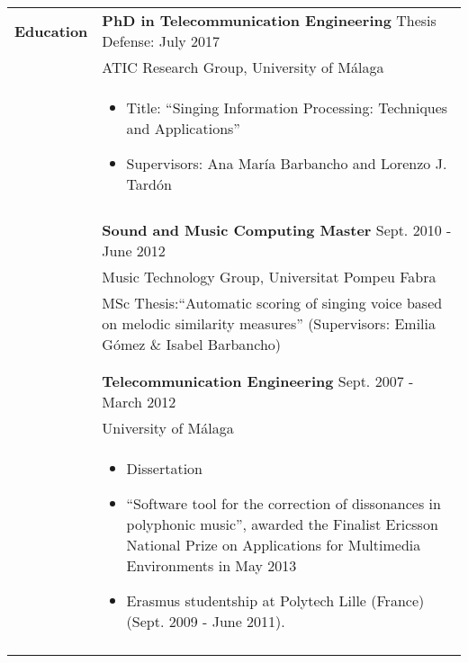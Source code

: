 \documentclass[letterpaper,11pt,oneside]{article}
\begin{document}
\noindent \begin{tabularx}{\linewidth}{l X}
 \Large{\textbf{Education}}    & \textbf{PhD in Telecommunication Engineering} \hfill Thesis Defense: July 2017\\
     & ATIC Research Group, University of Málaga\\
     & \vspace{-0.1cm}\begin{itemize}[nosep,noitemsep,topsep=0pt,partopsep=0pt]
         \item Title: ``Singing Information Processing: Techniques and Applications''
         \item Supervisors: Ana María Barbancho and Lorenzo J. Tardón
     \end{itemize}
     \\
     &\\
     & \textbf{Sound and Music Computing Master} \hfill Sept. 2010 - June 2012\\
     & Music Technology Group, Universitat Pompeu Fabra\\
     & MSc Thesis:``Automatic scoring of singing voice based on melodic similarity measures'' (Supervisors: Emilia Gómez \& Isabel Barbancho)
     \\
     &\\
     &\\
     & \textbf{Telecommunication Engineering} \hfill Sept. 2007 - March 2012\\
     & University of Málaga\\
     & \vspace{-0.1cm}\begin{itemize}[nosep,noitemsep,topsep=0pt,partopsep=0pt]
         \item Dissertation
         \item[] ``Software tool for the correction of dissonances in polyphonic music'', awarded the Finalist Ericsson National Prize on Applications for Multimedia Environments in May 2013
         \item Erasmus studentship at Polytech Lille (France) (Sept. 2009 - June 2011).
     \end{itemize}\\
     \\
\end{tabularx}
\end{document}
